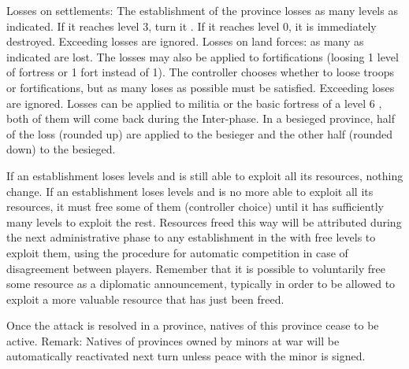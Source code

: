 \bparag Losses on settlements: The establishment of the province losses as
many levels as indicated. If it reaches level 3, turn it \Facemoins. If it
reaches level 0, it is immediately destroyed. Exceeding losses are ignored.
\bparag Losses on land forces: as many \LD as indicated are lost. The losses
may also be applied to fortifications (loosing 1 level of fortress or 1 fort
instead of 1\LD). The controller chooses whether to loose troops or
fortifications, but as many loses as possible must be satisfied. Exceeding
loses are ignored.
\bparag Losses can be applied to militia or the basic fortress of a level 6
\COL, both of them will come back during the Inter-phase.
\bparag In a besieged province, half of the loss (rounded up) are applied to
the besieger and the other half (rounded down) to the besieged.

\bparag If an establishment loses levels and is still able to exploit all its
resources, nothing change.
\bparag If an establishment loses levels and is no more able to exploit all
its resources, it must free some of them (controller choice) until it has
sufficiently many levels to exploit the rest.
\bparag Resources freed this way will be attributed during the next
administrative phase to any establishment in the \Area with free levels to
exploit them, using the procedure for automatic competition in case of
disagreement between players.
\bparag Remember that it is possible to voluntarily free some resource as a
diplomatic announcement, typically in order to be allowed to exploit a more
valuable resource that has just been freed.

\bparag Once the attack is resolved in a province, natives of this province
cease to be active.
\bparag Remark: Natives of provinces owned by \ROTW minors at war will be
automatically reactivated next turn unless peace with the minor is signed.


